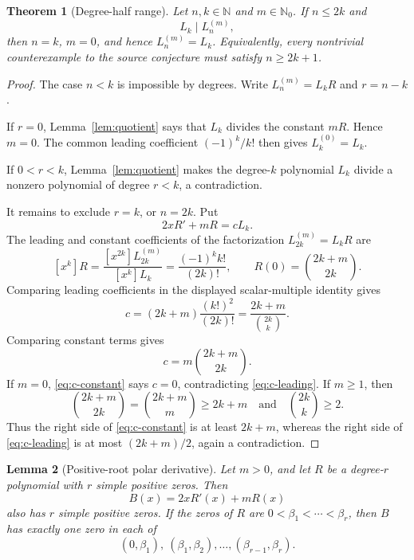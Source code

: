 \documentclass[11pt]{article}
\newtheorem{theorem}{Theorem}
\newtheorem{lemma}[theorem]{Lemma}
\theoremstyle{remark}
\newcommand{\Lag}[2]{L_{#1}^{(#2)}}
\begin{document}
\begin{theorem}[Degree-half range]\label{thm:main}
Let $n,k\in\mathbb N$ and $m\in\mathbb N_0$.  If $n\leq2k$ and
\[
                  L_k\mid\Lag{n}{m},
\]
then $n=k$, $m=0$, and hence $\Lag{n}{m}=L_k$.
Equivalently, every nontrivial counterexample to the source conjecture must
satisfy $n\geq2k+1$.
\end{theorem}

\begin{proof}
The case $n<k$ is impossible by degrees.  Write $\Lag{n}{m}=L_kR$ and
$r=n-k$.

If $r=0$, Lemma~\ref{lem:quotient} says that $L_k$ divides the constant
$mR$.  Hence $m=0$.  The common leading coefficient $(-1)^k/k!$ then
gives $\Lag{k}{0}=L_k$.

If $0<r<k$, Lemma~\ref{lem:quotient} makes the degree-$k$ polynomial
$L_k$ divide a nonzero polynomial of degree $r<k$, a contradiction.

It remains to exclude $r=k$, or $n=2k$.  Put
\[
              2xR'+mR=cL_k.
\]
The leading and constant coefficients of the factorization
$\Lag{2k}{m}=L_kR$ are
\[
 [x^k]R=\frac{[x^{2k}]\Lag{2k}{m}}{[x^k]L_k}
       =\frac{(-1)^k k!}{(2k)!},
 \qquad
 R(0)=\binom{2k+m}{2k}.
\]
Comparing leading coefficients in the displayed scalar-multiple identity
gives
\begin{equation}\label{eq:c-leading}
 c=(2k+m)\frac{(k!)^2}{(2k)!}
   =\frac{2k+m}{\binom{2k}{k}}.
\end{equation}
Comparing constant terms gives
\begin{equation}\label{eq:c-constant}
 c=m\binom{2k+m}{2k}.
\end{equation}
If $m=0$, \eqref{eq:c-constant} says $c=0$, contradicting
\eqref{eq:c-leading}.  If $m\geq1$, then
\[
 \binom{2k+m}{2k}=\binom{2k+m}{m}\geq 2k+m
 \quad\text{and}\quad \binom{2k}{k}\geq2.
\]
Thus the right side of \eqref{eq:c-constant} is at least $2k+m$,
whereas the right side of \eqref{eq:c-leading} is at most
$(2k+m)/2$, again a contradiction.
\end{proof}

\begin{lemma}[Positive-root polar derivative]\label{lem:polar}
Let $m>0$, and let $R$ be a degree-$r$ polynomial with $r$ simple positive
zeros.  Then
\[
                 B(x)=2xR'(x)+mR(x)
\]
also has $r$ simple positive zeros.  If the zeros of $R$ are
$0<\beta_1<\cdots<\beta_r$, then $B$ has exactly one zero in each of
\[
 (0,\beta_1),\ (\beta_1,\beta_2),\ldots,
 (\beta_{r-1},\beta_r).
\]
\end{lemma}
\end{document}
